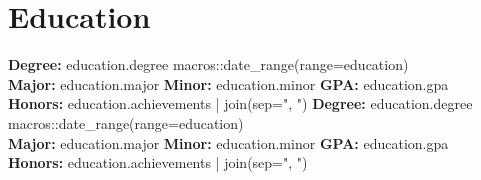 \documentclass[10pt]{resume}
\begin{document}

{%
\vspace{0.5em}
{%
{%

\section{Education}
{%
{%
\textbf{Degree:} {{ education.degree }} \hfill {{ macros::date_range(range=education) }}\\
\textbf{Major:} {{ education.major }} \textbf{Minor:} {{ education.minor }} \textbf{GPA:} {{ education.gpa }}\\
\textbf{Honors:} {{ education.achievements | join(sep=", ") }}
{%
{%
{%
\textbf{Degree:} {{ education.degree }} \hfill {{ macros::date_range(range=education) }}\\
\textbf{Major:} {{ education.major }} \textbf{Minor:} {{ education.minor }} \textbf{GPA:} {{ education.gpa }}\\
\textbf{Honors:} {{ education.achievements | join(sep=", ") }}
{%
}}}}}}}}}
\end{document}
